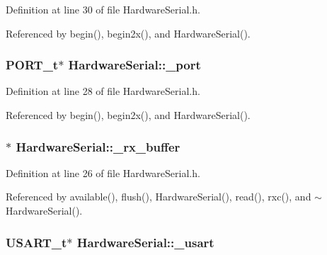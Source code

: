 Definition at line 30 of file HardwareSerial.h.



Referenced by begin(), begin2x(), and HardwareSerial().

\hypertarget{class_hardware_serial_add54c7d986c6122e8e8c23303f5b4845}{
\subsubsection[{\_\-port}]{\setlength{\rightskip}{0pt plus 5cm}PORT\_\-t$\ast$ {\bf HardwareSerial::\_\-port}}}
\label{class_hardware_serial_add54c7d986c6122e8e8c23303f5b4845}


Definition at line 28 of file HardwareSerial.h.



Referenced by begin(), begin2x(), and HardwareSerial().

\hypertarget{class_hardware_serial_a9ee5f8b61e049f98dfd0b5ae53e97273}{
\subsubsection[{\_\-rx\_\-buffer}]{$\ast$ {\bf HardwareSerial::\_\-rx\_\-buffer}}}
\label{class_hardware_serial_a9ee5f8b61e049f98dfd0b5ae53e97273}


Definition at line 26 of file HardwareSerial.h.



Referenced by available(), flush(), HardwareSerial(), read(), rxc(), and $\sim$HardwareSerial().

\hypertarget{class_hardware_serial_a3a3bd56aa561ae7e1eb1fd252b5b69a0}{
\subsubsection[{\_\-usart}]{\setlength{\rightskip}{0pt plus 5cm}USART\_\-t$\ast$ {\bf HardwareSerial::\_\-usart}}}
\label{class_hardware_serial_a3a3bd56aa561ae7e1eb1fd252b5b69a0}


